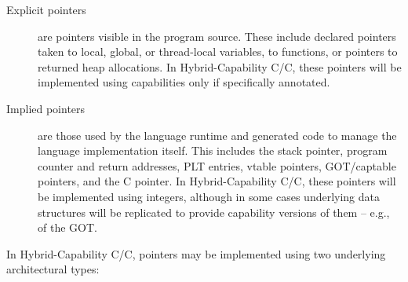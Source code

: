 \documentclass[12pt,twoside,openright,a4paper]{article}
\newcommand{\ccode}[1]{{\small\ttfamily{#1}}}
\newcommand{\note}[2]{{\color{blue}[ Note: #1 - #2]}}
\renewcommand{\note}[2]{\relax\ifhmode\unskip\fi}
\newcommand{\psnote}[1]{\note{#1}{Peter S.}}
\newcommand*{\cpp}{\texorpdfstring{C\textsmaller[2]{\protect\nolinebreak[4]\hspace{-.05em}\raisebox{.45ex}{\textbf{++}}}}{C++}}
\newcommand*{\COrCpp}{C/\cpp{}}
\newcommand*{\hybridCOrCpp}{Hybrid-Capability \COrCpp{}}
\begin{document}
\begin{description}
\item[Explicit pointers] are pointers visible in the program source.
  These include declared pointers taken to local, global, or thread-local
  variables, to functions, or pointers to returned heap allocations.
  In \hybridCOrCpp{}, these pointers will be implemented using capabilities
  only if specifically annotated.

\item[Implied pointers] are those used by the language runtime and generated
  code to manage the language implementation itself.
  This includes the stack pointer, program counter and return addresses, PLT
  entries, vtable pointers, GOT/captable pointers, and the \cpp{}
  \ccode{this} pointer.
  \psnote{wonder whether it'd be useful in this document to briefly explain what each of these latter three are for, to make it useful for C/C++ programmers and semanticists who aren't familiar with these internals?}
  \psnote{actually, maybe it's worth (time permitting) explaining all these, including side-by-side how they work in vanilla, pure-cap, and hybrid?}
  In \hybridCOrCpp{}, these pointers will be implemented using integers,
  although in some cases
\psnote{probably we should be explicit here about which and why, not just ``eg of the GOT''}
  underlying data structures will be replicated to
  provide capability versions of them -- e.g., of the GOT.
\end{description}

\noindent
In \hybridCOrCpp{}, pointers may be implemented using two underlying
architectural types:
\end{document}
